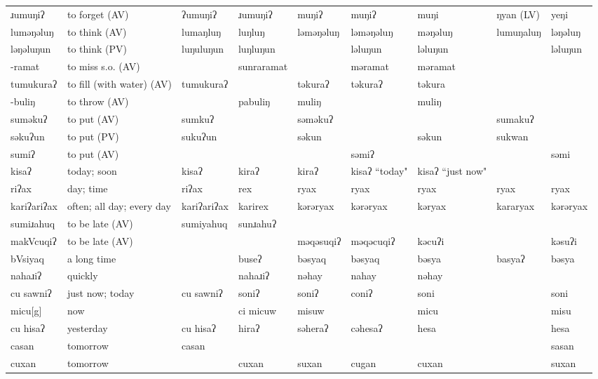 \begin{landscape}
\begin{longtable}{*{9}{p{}}}
\text{*}ɹumuŋiʔ & to forget (AV) & ʔumuŋiʔ & ɹumuŋiʔ & muŋiʔ & muŋiʔ & muŋi & ŋyan (LV) & yeŋi\\
\text{*}luməŋəluŋ & to think (AV) & lumaŋluŋ & luŋluŋ & ləməŋəluŋ & ləməŋəluŋ & məŋəluŋ & lumuŋaluŋ & ləŋəluŋ\\
\text{*}ləŋəluŋun & to think (PV) & luŋuluŋun & luŋluŋun &  & ləluŋun & ləluŋun &  & ləluŋun\\
\text{*}-ramat & to miss s.o. (AV) &  & sunraramat &  & məramat & məramat &  & \\
\text{*}tumukuraʔ & to fill (with water) (AV) & tumukuraʔ &  & təkuraʔ & təkuraʔ & təkura &  & \\
\text{*}-buliŋ & to throw (AV) &  & pabuliŋ & muliŋ &  & muliŋ &  & \\
\text{*}suməkuʔ & to put (AV) & sumkuʔ &  & səməkuʔ &  &  & sumakuʔ & \\
\text{*}səkuʔun & to put (PV) & sukuʔun &  & səkun &  & səkun & sukwan & \\
\text{*}sumiʔ & to put (AV) &  &  &  & səmiʔ &  &  & səmi\\
\text{*}kisaʔ & today; soon & kisaʔ & kiraʔ & kiraʔ & kisaʔ ``today" & kisaʔ ``just now" &  & \\
\text{*}riʔax & day; time & riʔax & rex & ryax & ryax & ryax & ryax & ryax\\
\text{*}kariʔariʔax & often; all day; every day & kariʔariʔax & karirex & kərəryax & kərəryax & kəryax & kararyax & kərəryax\\
\text{*}sumiɹahuq & to be late (AV) & sumiyahuq & sunɹahuʔ &  &  &  &  & \\
\text{*}makVcuqiʔ & to be late (AV) &  &  & məqəsuqiʔ & məqəcuqiʔ & kəcuʔi &  & kəsuʔi\\
\text{*}bVsiyaq & a long time &  & buseʔ & bəsyaq & bəsyaq & bəsya & basyaʔ & bəsya\\
\text{*}nahaɹiʔ & quickly &  & nahaɹiʔ & nəhay & nahay & nəhay &  & \\
\text{*}cu sawniʔ & just now; today & cu sawniʔ & soniʔ & soniʔ & coniʔ & soni &  & soni\\
\text{*}micu[g] & now &  & ci micuw & misuw &  & micu &  & misu\\
\text{*}cu hisaʔ & yesterday & cu hisaʔ & hiraʔ & səheraʔ & cəhesaʔ & hesa &  & hesa\\
\text{*}casan & tomorrow & casan &  &  &  &  &  & sasan\\
\text{*}cuxan & tomorrow &  & cuxan & suxan & cugan & cuxan &  & suxan\\

\end{longtable}
\end{landscape}
